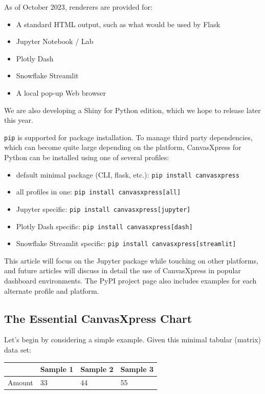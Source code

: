 \documentclass[
  letterpaper,
  DIV=11,
  numbers=noendperiod]{scrartcl}
\providecommand{\tightlist}{%
  \setlength{\itemsep}{0pt}\setlength{\parskip}{0pt}}\usepackage{longtable,booktabs,array}
\begin{document}
As of October 2023, renderers are provided for:

\begin{itemize}
\tightlist
\item
  A standard HTML output, such as what would be used by Flask
\item
  Jupyter Notebook / Lab
\item
  Plotly Dash
\item
  Snowflake Streamlit
\item
  A local pop-up Web browser
\end{itemize}

We are also developing a Shiny for Python edition, which we hope to
release later this year.

\texttt{pip} is supported for package installation. To manage third
party dependencies, which can become quite large depending on the
platform, CanvasXpress for Python can be installed using one of several
profiles:

\begin{itemize}
\tightlist
\item
  default minimal package (CLI, flask, etc.):
  \texttt{pip\ install\ canvasxpress}
\item
  all profiles in one: \texttt{pip\ install\ canvasxpress{[}all{]}}
\item
  Jupyter specific: \texttt{pip\ install\ canvasxpress{[}jupyter{]}}
\item
  Plotly Dash specific: \texttt{pip\ install\ canvasxpress{[}dash{]}}
\item
  Snowflake Streamlit specific:
  \texttt{pip\ install\ canvasxpress{[}streamlit{]}}
\end{itemize}

This article will focus on the Jupyter package while touching on other
platforms, and future articles will discuss in detail the use of
CanvasXpress in popular dashboard environments. The PyPI project page
also includes examples for each alternate profile and platform.

\hypertarget{the-essential-canvasxpress-chart}{%
\subsection{The Essential CanvasXpress
Chart}\label{the-essential-canvasxpress-chart}}

Let's begin by considering a simple example. Given this minimal tabular
(matrix) data set:

\begin{longtable}[]{@{}llll@{}}
\toprule\noalign{}
& Sample 1 & Sample 2 & Sample 3 \\
\midrule\noalign{}
\endhead
\bottomrule\noalign{}
\endlastfoot
Amount & 33 & 44 & 55 \\
\end{longtable}
\end{document}
